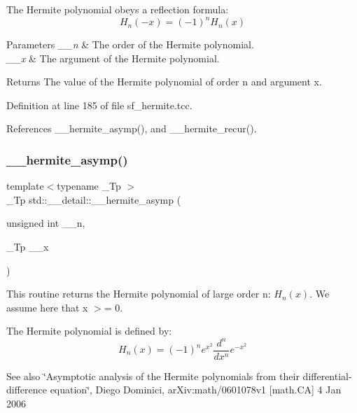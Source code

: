 The Hermite polynomial obeys a reflection formula\+: \[ H_n(-x) = (-1)^n H_n(x) \]


\begin{DoxyParams}{Parameters}
{\em \+\_\+\+\_\+n} & The order of the Hermite polynomial. \\
\hline
{\em \+\_\+\+\_\+x} & The argument of the Hermite polynomial. \\
\hline
\end{DoxyParams}
\begin{DoxyReturn}{Returns}
The value of the Hermite polynomial of order n and argument x. 
\end{DoxyReturn}


Definition at line 185 of file sf\+\_\+hermite.\+tcc.



References \+\_\+\+\_\+hermite\+\_\+asymp(), and \+\_\+\+\_\+hermite\+\_\+recur().

\mbox{\label{namespacestd_1_1____detail_ae44761bc16e62979edeccf4535ec553a}} 
\subsubsection{\texorpdfstring{\+\_\+\+\_\+hermite\+\_\+asymp()}{\_\_hermite\_asymp()}}
{\footnotesize\ttfamily template$<$typename \+\_\+\+Tp $>$ \\
\+\_\+\+Tp std\+::\+\_\+\+\_\+detail\+::\+\_\+\+\_\+hermite\+\_\+asymp (\begin{DoxyParamCaption}\item[{unsigned int}]{\+\_\+\+\_\+n,  }\item[{\+\_\+\+Tp}]{\+\_\+\+\_\+x }\end{DoxyParamCaption})}



This routine returns the Hermite polynomial of large order n\+: $ H_n(x) $. We assume here that x $>$= 0. 

The Hermite polynomial is defined by\+: \[ H_n(x) = (-1)^n e^{x^2} \frac{d^n}{dx^n} e^{-x^2} \]

\begin{DoxySeeAlso}{See also}
\char`\"{}\+Asymptotic analysis of the Hermite polynomials
      from their differential-\/difference equation\char`\"{}, Diego Dominici, ar\+Xiv\+:math/0601078v1 \mbox{[}math.\+CA\mbox{]} 4 Jan 2006 
\end{DoxySeeAlso}

